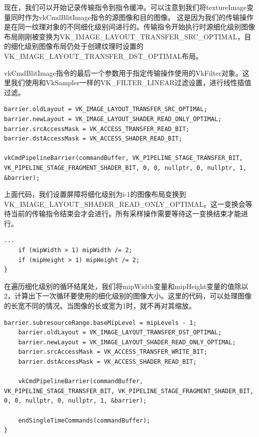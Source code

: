 \documentclass{ctexart}
\begin{document}
现在，我们可以开始记录传输指令到指令缓冲。可以注意到我们将textureImage变量同时作为vkCmdBlitImage指令的源图像和目的图像。 这是因为我们的传输操作是在同一纹理对象的不同细化级别间进行的。传输指令开始执行时源细化级别图像布局刚刚被变换为VK\_IMAGE\_LAYOUT\_TRANSFER\_SRC\_OPTIMAL，目的细化级别图像布局仍处于创建纹理时设置的VK\_IMAGE\_LAYOUT\_TRANSFER\_DST\_OPTIMAL布局。

vkCmdBlitImage指令的最后一个参数用于指定传输操作使用的VkFilter对象。这里我们使用和VkSampler一样的VK\_FILTER\_LINEAR过滤设置，进行线性插值过滤。

\begin{lstlisting}[language={[ANSI]C}]
barrier.oldLayout = VK_IMAGE_LAYOUT_TRANSFER_SRC_OPTIMAL;
barrier.newLayout = VK_IMAGE_LAYOUT_SHADER_READ_ONLY_OPTIMAL;
barrier.srcAccessMask = VK_ACCESS_TRANSFER_READ_BIT;
barrier.dstAccessMask = VK_ACCESS_SHADER_READ_BIT;

vkCmdPipelineBarrier(commandBuffer, VK_PIPELINE_STAGE_TRANSFER_BIT, VK_PIPELINE_STAGE_FRAGMENT_SHADER_BIT, 0, 0, nullptr, 0, nullptr, 1, &barrier);
\end{lstlisting}

上面代码，我们设置屏障将细化级别为i-1的图像布局变换到VK\_IMAGE\_LAYOUT\_SHADER\_READ\_ONLY\_OPTIMAL。这一变换会等待当前的传输指令结束会才会进行。所有采样操作需要等待这一变换结束才能进行。

\begin{lstlisting}[language={[ANSI]C}]
		...
	if (mipWidth > 1) mipWidth /= 2;
	if (mipHeight > 1) mipHeight /= 2;
}
\end{lstlisting}

在遍历细化级别的循环结尾处，我们将mipWidth变量和mipHeight变量的值除以2，计算出下一次循环要使用的细化级别的图像大小。这里的代码，可以处理图像的长宽不同的情况。当图像的长或宽为1时，就不再对其缩放。

\begin{lstlisting}[language={[ANSI]C}]
	barrier.subresourceRange.baseMipLevel = mipLevels - 1;
	barrier.oldLayout = VK_IMAGE_LAYOUT_TRANSFER_DST_OPTIMAL;
	barrier.newLayout = VK_IMAGE_LAYOUT_SHADER_READ_ONLY_OPTIMAL;
	barrier.srcAccessMask = VK_ACCESS_TRANSFER_WRITE_BIT;
	barrier.dstAccessMask = VK_ACCESS_SHADER_READ_BIT;

	vkCmdPipelineBarrier(commandBuffer, VK_PIPELINE_STAGE_TRANSFER_BIT, VK_PIPELINE_STAGE_FRAGMENT_SHADER_BIT, 0, 0, nullptr, 0, nullptr, 1, &barrier);

	endSingleTimeCommands(commandBuffer);
}
\end{lstlisting}
\end{document}
